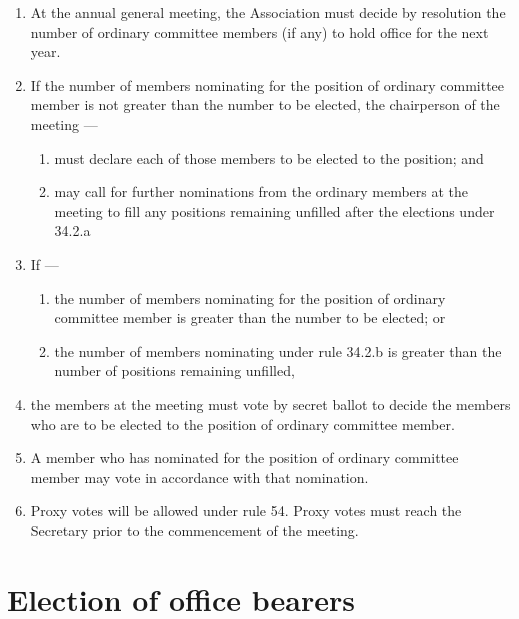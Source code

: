 \begin{enumerate}

\item At the annual general meeting, the Association must decide by resolution the number of ordinary committee members (if any) to hold office for the next year.
\item If the number of members nominating for the position of ordinary committee member is not greater than the number to be elected, the chairperson of the meeting ---

  \begin{enumerate}
  
  \item must declare each of those members to be elected to the position; and
  \item may call for further nominations from the ordinary members at the meeting to fill any positions remaining unfilled after the elections under 34.2.a
  \end{enumerate}
\item If ---

  \begin{enumerate}
  
  \item the number of members nominating for the position of ordinary committee member is greater than the number to be elected; or
  \item the number of members nominating under rule 34.2.b is greater than the number of positions remaining unfilled,
  \end{enumerate}
\item the members at the meeting must vote by secret ballot to decide the members who are to be elected to the position of ordinary committee member.
\item A member who has nominated for the position of ordinary committee member may vote in accordance with that nomination.
\item Proxy votes will be allowed under rule 54. Proxy votes must reach the Secretary prior to the commencement of the meeting.
\end{enumerate}

\hypertarget{election-of-office-bearers}{%
\section{Election of office bearers}\label{election-of-office-bearers}}

